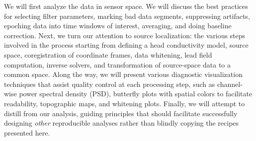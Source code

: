 We will first analyze the data in sensor space. We will discuss the best practices for selecting filter parameters, marking bad data segments, suppressing artifacts, epoching data into time windows of interest, averaging, and doing baseline correction. Next, we turn our attention to source localization: the various steps involved in the process starting from defining a head conductivity model, source space, coregistration of coordinate frames, data whitening, lead field computation, inverse solvers, and transformation of source-space data to a common space. Along the way, we will present various diagnostic visualization techniques that assist quality control at each processing step, such as channel-wise power spectral density (PSD), butterfly plots with spatial colors to facilitate readability, topographic maps, and whitening plots. Finally, we will attempt to distill from our analysis, guiding principles that should facilitate successfully designing \textit{other} reproducible analyses rather than blindly copying the recipes presented here. 
